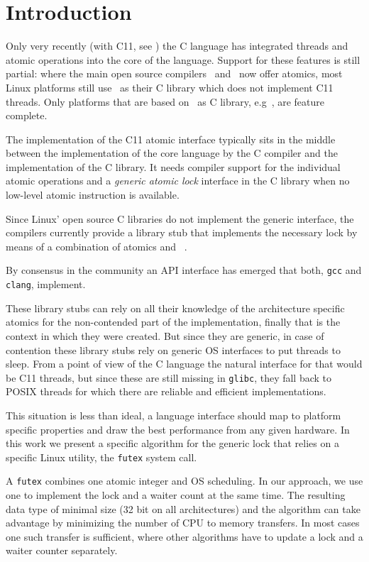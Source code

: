 
\section{Introduction}
\label{sec-1}

Only very recently (with C11, see \citeauthor{C11}) the C language has
integrated threads and atomic operations into the core of the
language.  Support for these features is still partial: where the
main open source compilers~\citeauthor{gcc} and~\citeauthor{clang} now offer atomics, most Linux
platforms still use~\citeauthor{glibc}
as their C library which does not implement C11 threads. Only
platforms that are based on~\citeauthor{musl} as C
library, e.g~\citeauthor{alpine}, are
feature complete.

The implementation of the C11 atomic interface typically sits in the
middle between the implementation of the core language
by the C compiler and the implementation of the
C library. It needs compiler support for the individual atomic operations
and a \emph{generic atomic lock} interface in the C library when no
low-level atomic instruction is available.


Since Linux' open source C libraries do not implement the generic
interface, the compilers currently provide a library stub that
implements the necessary lock by means of a combination of atomics
and~\citeauthor{POSIX2009}
.

By consensus in the community an API interface
has emerged that both, \texttt{gcc} and \texttt{clang}, implement.

These library stubs can rely on all their knowledge of the architecture
specific atomics for the non-contended part of the implementation, finally
that is the context in which they were created. But since
they are generic, in case of contention these
library stubs rely on generic OS interfaces to put threads to
sleep.
From a point of view of the C language the natural interface
for that would be C11 threads,
but since these are still missing in \texttt{glibc}, they fall back to
POSIX threads
for which there are reliable and efficient implementations.

This situation is less than ideal, a language interface
should map to platform specific properties
and draw the best performance from any given hardware. In
this work we present a specific algorithm for the generic lock that
relies on a specific Linux utility, the \texttt{futex} system
call.

A \texttt{futex} combines one atomic integer and OS scheduling.
In our approach, we
use one  to
implement the lock and a waiter count at the same time.
The resulting data type of minimal size (32 bit on all
architectures) and the algorithm can take advantage
by minimizing the number of CPU to memory transfers. In most cases
one such transfer is sufficient, where other algorithms have to
update a lock and a waiter counter separately.

